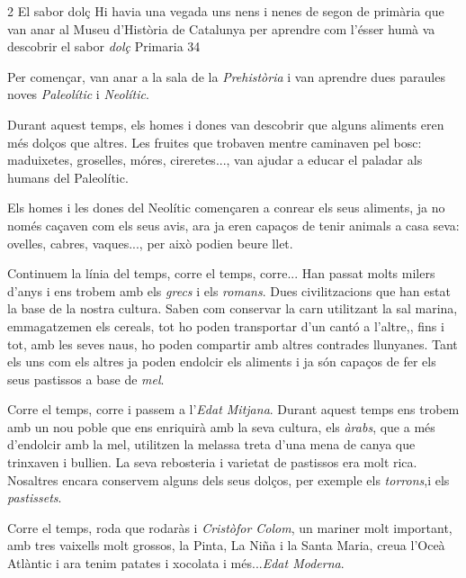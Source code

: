 %
%
\begin{news}
{2} %
{El sabor dolç}
{Hi havia una vegada uns nens i nenes de segon de primària que van anar al Museu d’Història de Catalunya per aprendre com l’ésser humà va descobrir el sabor \emph{dolç}}
{Primaria}
{34} %

\noindent{}

Per començar, van anar a la sala de la \emph{Prehistòria} i van aprendre dues paraules noves \emph{Paleolític} i \emph{Neolític}.

Durant aquest temps, els homes i dones van descobrir que alguns aliments eren més dolços que altres. Les fruites que trobaven mentre caminaven pel bosc: maduixetes, groselles, móres, cireretes..., van ajudar a educar el paladar als humans del Paleolític. 

Els homes i les dones del Neolític començaren a conrear els seus aliments, ja no només caçaven com els seus avis, ara ja eren  capaços de tenir animals a casa seva: ovelles, cabres, vaques..., per això podien beure llet.

Continuem la línia del temps, corre el temps, corre... Han passat molts milers d’anys i ens trobem amb els \emph{grecs} i els \emph{romans}. Dues civilitzacions que han estat la base de la nostra cultura. Saben com conservar la carn utilitzant la sal marina, emmagatzemen els cereals, tot ho poden transportar d’un cantó a l’altre,, fins i tot, amb les seves naus, ho poden compartir amb altres contrades llunyanes. Tant els uns com els altres ja poden endolcir els aliments i ja són capaços de fer els seus pastissos  a base de \emph{mel}.

Corre el temps, corre i passem a l’\emph{Edat Mitjana}. Durant aquest temps ens trobem amb un nou poble que ens enriquirà amb la seva cultura, els \emph{àrabs}, que a més d’endolcir amb la mel, utilitzen la melassa treta d’una mena de canya que trinxaven i bullien. La seva rebosteria i varietat de pastissos era molt rica. Nosaltres encara conservem alguns dels seus dolços, per exemple els \emph{torrons},i els \emph{pastissets}.

Corre el temps,  roda que rodaràs i \emph{Cristòfor Colom},  un mariner molt important, amb tres vaixells molt grossos, la Pinta, La Niña i la Santa Maria, creua l’Oceà Atlàntic i ara tenim patates i xocolata i més...\emph{Edat Moderna}.


\end{news}
